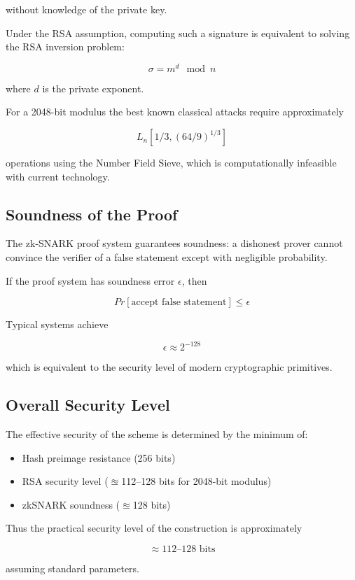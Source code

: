 \documentclass[]{article}
\begin{document}
without knowledge of the private key.

Under the RSA assumption, computing such a signature is equivalent to solving the RSA inversion problem:

$$
\sigma = m^d \mod n
$$

where $d$ is the private exponent.

For a 2048-bit modulus the best known classical attacks require approximately

$$
L_n[1/3,(64/9)^{1/3}]
$$

operations using the Number Field Sieve, which is computationally infeasible with current technology.

\subsection{Soundness of the Proof}

The zk-SNARK proof system guarantees soundness: a dishonest prover cannot convince the verifier of a false statement except with negligible probability.

If the proof system has soundness error $\epsilon$, then

$$
Pr[\text{accept false statement}] \le \epsilon
$$

Typical systems achieve

$$
\epsilon \approx 2^{-128}
$$

which is equivalent to the security level of modern cryptographic primitives.

\subsection{Overall Security Level}

The effective security of the scheme is determined by the minimum of:

\begin{itemize}
	\item Hash preimage resistance (256 bits)
	\item RSA security level ($\approxeq$112–128 bits for 2048-bit modulus)
	\item zkSNARK soundness ($\approxeq$128 bits)
\end{itemize}

Thus the practical security level of the construction is approximately

$$
\approx 112\text{–}128 \text{ bits}
$$

assuming standard parameters.
\end{document}
